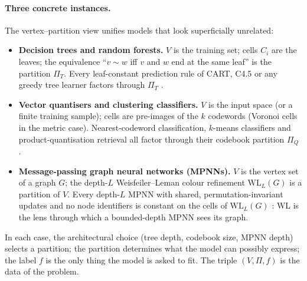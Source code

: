 \documentclass[10pt]{article}
\theoremstyle{definition}
\theoremstyle{remark}
\begin{document}
\paragraph{Three concrete instances.} The vertex--partition view
unifies models that look superficially unrelated:
\begin{itemize}
  \item \textbf{Decision trees and random forests.} $V$ is the
    training set; cells $C_{i}$ are the leaves; the equivalence
    ``$v \sim w$ iff $v$ and $w$ end at the same leaf'' is the
    partition $\Pi_{T}$. Every leaf-constant prediction rule of
    CART, C4.5 or any greedy tree learner factors through
    $\Pi_{T}$ \citep{breiman1984cart,devroye1996ptpr}.
  \item \textbf{Vector quantisers and clustering classifiers.}
    $V$ is the input space (or a finite training sample); cells
    are pre-images of the $k$ codewords (Voronoi cells in the
    metric case). Nearest-codeword classification, $k$-means
    classifiers and product-quantisation retrieval all factor
    through their codebook partition $\Pi_{Q}$
    \citep{gersho1991vq,jegou2011pq}.
  \item \textbf{Message-passing graph neural networks (MPNNs).}
    $V$ is the vertex set of a graph $G$; the depth-$L$
    Weisfeiler--Leman colour refinement
    $\mathrm{WL}_{L}(G)$ is a partition of $V$. Every depth-$L$
    MPNN with shared, permutation-invariant updates and no node
    identifiers is constant on the cells of $\mathrm{WL}_{L}(G)$
    \citep{xu2019gin,morris2019wl}: WL is the lens through which a
    bounded-depth MPNN sees its graph.
\end{itemize}
In each case, the architectural choice (tree depth, codebook size,
MPNN depth) selects a partition; the partition determines what
the model can possibly express; the label $f$ is the only thing
the model is asked to fit. The triple $(V, \Pi, f)$ is the data
of the problem.
\end{document}
